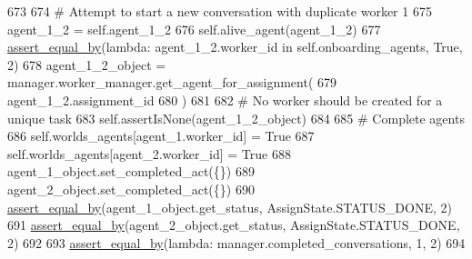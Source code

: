 \begin{DoxyCode}
673 
674         \textcolor{comment}{# Attempt to start a new conversation with duplicate worker 1}
675         agent\_1\_2 = self.agent\_1\_2
676         self.alive\_agent(agent\_1\_2)
677         \hyperlink{namespaceparlai_1_1mturk_1_1core_1_1test_1_1test__full__system_a0b463246d35658a2e422010f13dcf819}{assert\_equal\_by}(\textcolor{keyword}{lambda}: agent\_1\_2.worker\_id \textcolor{keywordflow}{in} self.onboarding\_agents, \textcolor{keyword}{True}, 2)
678         agent\_1\_2\_object = manager.worker\_manager.get\_agent\_for\_assignment(
679             agent\_1\_2.assignment\_id
680         )
681 
682         \textcolor{comment}{# No worker should be created for a unique task}
683         self.assertIsNone(agent\_1\_2\_object)
684 
685         \textcolor{comment}{# Complete agents}
686         self.worlds\_agents[agent\_1.worker\_id] = \textcolor{keyword}{True}
687         self.worlds\_agents[agent\_2.worker\_id] = \textcolor{keyword}{True}
688         agent\_1\_object.set\_completed\_act(\{\})
689         agent\_2\_object.set\_completed\_act(\{\})
690         \hyperlink{namespaceparlai_1_1mturk_1_1core_1_1test_1_1test__full__system_a0b463246d35658a2e422010f13dcf819}{assert\_equal\_by}(agent\_1\_object.get\_status, AssignState.STATUS\_DONE, 2)
691         \hyperlink{namespaceparlai_1_1mturk_1_1core_1_1test_1_1test__full__system_a0b463246d35658a2e422010f13dcf819}{assert\_equal\_by}(agent\_2\_object.get\_status, AssignState.STATUS\_DONE, 2)
692 
693         \hyperlink{namespaceparlai_1_1mturk_1_1core_1_1test_1_1test__full__system_a0b463246d35658a2e422010f13dcf819}{assert\_equal\_by}(\textcolor{keyword}{lambda}: manager.completed\_conversations, 1, 2)
694 
\end{DoxyCode}
\mbox{\label{classparlai_1_1mturk_1_1core_1_1dev_1_1test_1_1test__full__system_1_1TestMTurkManagerWorkflows_ae7c5a42a3742d9ed616af725f87192bf}} 
